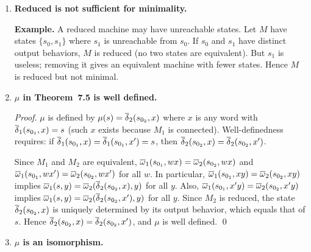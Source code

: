 \begin{enumerate}[{7.}1.]
\begin{proof}
$\omega_{E_M}([s]_{E_M},\pmb{a})=\omega(s,\pmb{a})$.  Suppose $s E_M s'$.  By the definition of $E_M$ (states are equivalent iff they produce the same output on all inputs), in particular on the single letter $\pmb{a}$: $\omega(s,\pmb{a})=\omega(s',\pmb{a})$.  Hence $\omega_{E_M}$ is independent of the choice of representative.
Also, for every $[s]_{E_M}\in S_{E_M}$ and every $\pmb{a}\in\Sigma$, $\omega$ is
defined on $(s,\pmb{a})$, so $\omega_{E_M}$ is defined on all of
$S_{E_M}\times\Sigma$. \qed
\end{proof}

\item \textbf{Reduced is not sufficient for minimality.}

\textbf{Example.}  A reduced machine may have unreachable states.  Let $M$ have states $\{s_0,s_1\}$ where $s_1$ is unreachable from $s_0$.  If $s_0$ and $s_1$ have distinct output behaviors, $M$ is reduced (no two states are equivalent).  But $s_1$ is useless; removing it gives an equivalent machine with fewer states.  Hence $M$ is reduced but not minimal.

\item \textbf{$\mu$ in Theorem~7.5 is well defined.}

\begin{proof}
$\mu$ is defined by $\mu(s)=\overline{\delta}_2(s_{0_2},x)$ where $x$ is any word with $\overline{\delta}_1(s_{0_1},x)=s$ (such $x$ exists because $M_1$ is connected).  Well-definedness requires: if $\overline{\delta}_1(s_{0_1},x)=\overline{\delta}_1(s_{0_1},x')=s$, then $\overline{\delta}_2(s_{0_2},x)=\overline{\delta}_2(s_{0_2},x')$.

Since $M_1$ and $M_2$ are equivalent, $\overline{\omega}_1(s_{0_1},wx)=\overline{\omega}_2(s_{0_2},wx)$ and $\overline{\omega}_1(s_{0_1},wx')=\overline{\omega}_2(s_{0_2},wx')$ for all $w$.  In particular, $\overline{\omega}_1(s_{0_1},xy)=\overline{\omega}_2(s_{0_2},xy)$ implies $\overline{\omega}_1(s,y)=\overline{\omega}_2(\overline{\delta}_2(s_{0_2},x),y)$ for all $y$.  Also, $\overline{\omega}_1(s_{0_1},x'y)=\overline{\omega}_2(s_{0_2},x'y)$ implies $\overline{\omega}_1(s,y)=\overline{\omega}_2(\overline{\delta}_2(s_{0_2},x'),y)$ for all $y$.  Since $M_2$ is reduced, the state $\overline{\delta}_2(s_{0_2},x)$ is uniquely determined by its output behavior, which equals that of $s$.  Hence $\overline{\delta}_2(s_{0_2},x)=\overline{\delta}_2(s_{0_2},x')$, and $\mu$ is well defined. \qed
\end{proof}

\item \textbf{$\mu$ is an isomorphism.}


\end{enumerate}
